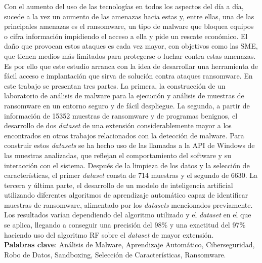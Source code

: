 \noindent Con el aumento del uso de las tecnologías en todos los aspectos del día a día, sucede a la vez un aumento de las amenazas hacia estas y, entre ellas, una de las principales amenazas es el ransomware, un tipo de malware que bloquea equipos o cifra información impidiendo el acceso a ella y pide un rescate económico. El daño que provocan estos ataques es cada vez mayor, con objetivos como las \gls{SME}, que tienen medios más limitados para protegerse o luchar contra estas amenazas. Es por ello que este estudio arranca con la idea de desarrollar una herramienta de fácil acceso e implantación que sirva de solución contra ataques ransomware.
En este trabajo se presentan tres partes. La primera, la construcción de un laboratorio de análisis de malware para la ejecución y análisis de muestras de ransomware en un entorno seguro y de fácil despliegue. La segunda, a partir de información de 15352 muestras de ransomware y de programas benignos, el desarrollo de dos \textit{dataset} de una extensión considerablemente mayor a los encontrados en otros trabajos relacionados con la detección de malware. Para construir estos \textit{datasets} se ha hecho uso de las llamadas a la \gls{API} de Windows de las muestras analizadas, que reflejan el comportamiento del software y su interacción con el sistema. Después de la limpieza de los datos y la selección de características, el primer \textit{dataset} consta de 714 muestras y el segundo de 6630. La tercera y última parte, el desarrollo de un modelo de inteligencia artificial utilizando diferentes algoritmos de aprendizaje automático capaz de identificar muestras de ransomware, alimentado por los \textit{datasets} mencionados previamente.
Los resultados varían dependiendo del algoritmo utilizado y el \textit{dataset} en el que se aplica, llegando a conseguir una precisión del 98\% y una exactitud del 97\% haciendo uso del algoritmo \gls{RF} sobre el \textit{dataset} de mayor extensión.\\

\vspace{0.2cm}
\noindent \textbf{Palabras clave}: Análisis de Malware, Aprendizaje Automático, Ciberseguridad, Robo de Datos, Sandboxing, Selección de Características, Ransomware.

